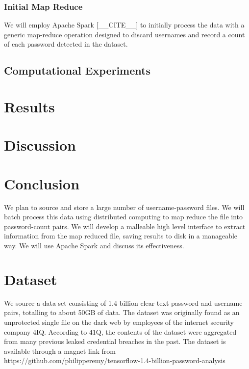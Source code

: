 \documentclass{article}
\begin{document}
\begin{multicols}{2}
\subsubsection*{Initial Map Reduce}
We will employ Apache Spark [\_\_CITE\_\_] to initially process the data with a generic map-reduce operation designed to discard usernames and record a count of each password detected in the dataset.

\subsection*{\centering Computational Experiments}

\section*{\centering Results}

\section*{\centering Discussion}
\cite{kelley2012guess} \cite{weir2009password}

\section*{\centering Conclusion}

{\color{red}

We plan to source and store a large number of username-password files. We will batch process this data using distributed computing to map reduce the file into password-count pairs. We will develop a malleable high level interface to extract information from the map reduced file, saving results to disk in a manageable way.  We will use Apache Spark and discuss its effectiveness.

\section*{Dataset}
We source a data set consisting of 1.4 billion clear text password and username pairs, totalling to about 50GB of data. The dataset was originally found as an unprotected single file on the dark web by employees of the internet security company 4IQ. According to 41Q, the contents of the dataset were aggregated from many previous leaked credential breaches in the past. The dataset is available through a magnet link from https://github.com/philipperemy/tensorflow-1.4-billion-password-analysis

}
\end{multicols}
\end{document}

